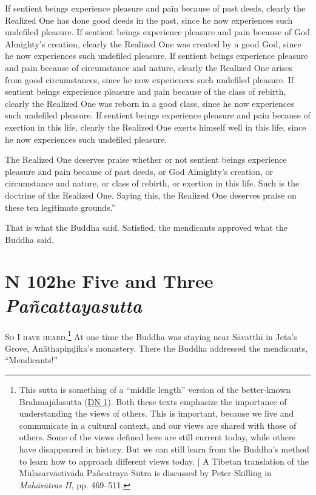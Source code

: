 \documentclass[12pt,openany]{book}%
\newcommand*{\suttatitleacronym}[1]{\smaller[2]{#1}\vspace*{.3em}}
\newcommand*{\suttatitletranslation}[1]{\linebreak{#1}}
\newcommand*{\suttatitleroot}[1]{\linebreak\smaller[2]\itshape{#1}}
\newcommand*{\tocacronym}[1]{\hspace*{-3.3em}{#1}\quad}
\newcommand*{\toctranslation}[1]{#1}
\newcommand*{\tocroot}[1]{(\textit{#1})}
\newcommand*{\scevam}[1]{\textsc{#1}}
\begin{document}
If sentient beings experience pleasure and pain because of past deeds, clearly the Realized One has done good deeds in the past, since he now experiences such undefiled pleasure. If sentient beings experience pleasure and pain because of God Almighty’s creation, clearly the Realized One was created by a good God, since he now experiences such undefiled pleasure. If sentient beings experience pleasure and pain because of circumstance and nature, clearly the Realized One arises from good circumstances, since he now experiences such undefiled pleasure. If sentient beings experience pleasure and pain because of the class of rebirth, clearly the Realized One was reborn in a good class, since he now experiences such undefiled pleasure. If sentient beings experience pleasure and pain because of exertion in this life, clearly the Realized One exerts himself well in this life, since he now experiences such undefiled pleasure. 

The Realized One deserves praise whether or not sentient beings experience pleasure and pain because of past deeds, or God Almighty’s creation, or circumstance and nature, or class of rebirth, or exertion in this life. Such is the doctrine of the Realized One. Saying this, the Realized One deserves praise on these ten legitimate grounds.” 

That is what the Buddha said. Satisfied, the mendicants approved what the Buddha said. 

%
\section*{{\suttatitleacronym MN 102}{\suttatitletranslation The Five and Three }{\suttatitleroot Pañcattayasutta}}
\addcontentsline{toc}{section}{\tocacronym{MN 102} \toctranslation{The Five and Three } \tocroot{Pañcattayasutta}}

\scevam{So I have heard.\footnote{This sutta is something of a “middle length” version of the better-known \textsanskrit{Brahmajālasutta} (\href{https://suttacentral.net/dn1/en/sujato}{DN 1}). Both these texts emphasize the importance of understanding the views of others. This is important, because we live and communicate in a cultural context, and our views are shared with those of others. Some of the views defined here are still current today, while others have disappeared in history. But we can still learn from the Buddha’s method to learn how to approach different views today. | A Tibetan translation of the \textsanskrit{Mūlasarvāstivāda} \textsanskrit{Pañcatraya} \textsanskrit{Sūtra} is discussed by Peter Skilling in \emph{\textsanskrit{Mahāsūtras} II}, pp. 469–511. } }At one time the Buddha was staying near \textsanskrit{Sāvatthī} in Jeta’s Grove, \textsanskrit{Anāthapiṇḍika}’s monastery. There the Buddha addressed the mendicants, “Mendicants!” 
\end{document}

